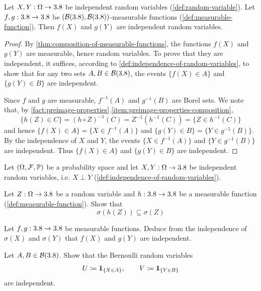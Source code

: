 \begin{theorem}\label{thm:independence-under-measurable-transformations}
Let $X,Y : \Omega \to 3.8$ be independent random variables (\autoref{def:random-variable}).
Let $f,g : 3.8 \to 3.8$ be $(\mathcal{B}(3.8),\mathcal{B}(3.8))$-measurable functions (\autoref{def:measurable-function}).
Then $f(X)$ and $g(Y)$ are independent random variables.
\end{theorem}
\begin{proof}
By \autoref{thm:composition-of-measurable-functions}, the functions $f(X)$ and $g(Y)$ are measurable, hence random variables.
To prove that they are independent, it suffices,
according to 
\autoref{def:independence-of-random-variables},
to show that for any two sets $A, \allowbreak B \allowbreak \in \allowbreak \mathcal{B}(3.8)$, the events $\{f(X) \in A\}$ and $\{g(Y) \in B\}$ are independent.

Since $f$ and $g$ are measurable, $f^{-1}(A)$ and $g^{-1}(B)$ are Borel sets.
We note that, by \autoref{fact:preimage-properties}.\ref{item:preimage-properties-composition},
\[
\{h(Z) \in C\} = (h \circ Z)^{-1}(C) = Z^{-1}(h^{-1}(C)) = \{Z \in h^{-1}(C)\} 
\]
and hence  $\{f(X) \in A\}=\{X\in f^{-1}(A)\}$ and $\{g(Y)\in B\}=\{Y\in g^{-1}(B)\}$.
By the independence of $X$ and $Y$, the events $\{X \in f^{-1}(A)\}$ and $\{Y \in g^{-1}(B)\}$ are independent.
Thus $\{f(X) \in A\}$ and $\{g(Y) \in B\}$ are independent.
\end{proof}

\begin{exercise} %
Let $(\Omega,\mathcal{F},\mathbb{P})$ be a probability space and let $X,Y : \Omega \to 3.8$ be independent random variables, i.e. $X \perp Y$ (\autoref{def:independence-of-random-variables}).
\begin{enumerate}[label={\protect\hyperref[solitem:independence-derived-observables:\arabic*]{(\alph*)}}]
\item \label{exitem:independence-derived-observables:1}
Let $Z : \Omega \to 3.8$ be a random variable and
$h : 3.8 \to 3.8$ be a measurable function (\autoref{def:measurable-function}). 
Show that
\[
\sigma(h(Z)) \subseteq \sigma(Z)
\]
\item \label{exitem:independence-derived-observables:2}
Let $f, g : 3.8 \to 3.8$ be measurable functions.
Deduce from the independence of $\sigma(X)$ and $\sigma(Y)$ that $f(X)$ and $g(Y)$ are independent.
\item \label{exitem:independence-derived-observables:3}
Let $A,B \in \mathcal{B}(3.8)$. Show that the Bernoulli random variables
\[
U \coloneq \mathbf{1}_{\{X \in A\}},
\qquad
V \coloneq \mathbf{1}_{\{Y \in B\}}
\]
are independent.
\qedhere
\end{enumerate}
\end{exercise}

